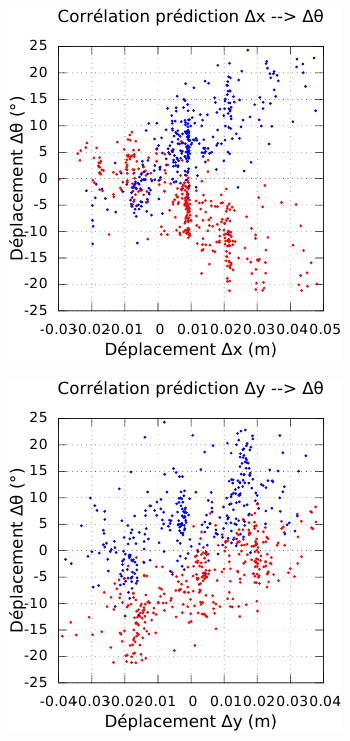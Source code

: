 \begin{figure}[htbp]
\begin{subfigure}{0.22\paperwidth}
    \end{subfigure}
    \vspace{0.2cm}
    \newline
    \begin{subfigure}{0.22\paperwidth}
        \centering
        \includegraphics[type=pdf,ext=.pdf,read=.pdf,width=1.0\linewidth]{../plot/OdometryLWPR/grass_close_function_goal_x_yaw}
    \end{subfigure}
    \begin{subfigure}{0.22\paperwidth}
        \centering
        \includegraphics[type=pdf,ext=.pdf,read=.pdf,width=1.0\linewidth]{../plot/OdometryLWPR/grass_close_function_goal_y_yaw}

\end{subfigure}
\end{figure}
